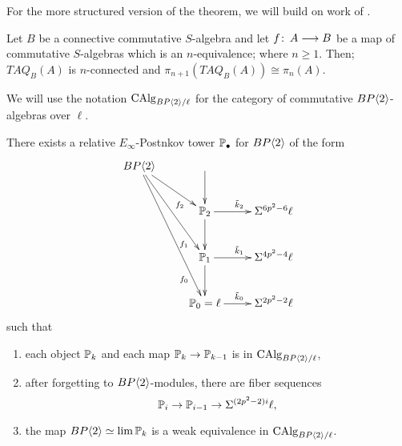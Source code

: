 For the more structured version of the theorem, we will build on work of \cite{Basterra}.
\begin{lem}
Let $B$ be a connective commutative $S$-algebra and let $f\colon \thinspace A\longrightarrow B$ be a map of commutative $S$-algebras which is an $n$-equivalence; where $n\ge 1$. Then; $TAQ_{B}(A)$ is $n$-connected and $\pi_{n+1}(TAQ_B(A))\cong \pi_n(A)$.
\end{lem}
We will use the notation $\operatorname{CAlg}_{BP\langle 2 \rangle/\ell}$ for the category of commutative $BP\langle 2 \rangle$-algebras over $\ell$. 
\begin{thm}
There exists a relative $E_{\infty}$-Postnkov tower $\mathbb{P}_{\bullet}$ for $BP\langle 2 \rangle$ of the form 
\[ 
\xymatrix{
\B \ar[dr]_(.7){f_2} \ar[ddr]_(.8){f_1} \ar[dddr]_(.8){f_0} &	\ar[d] & \\
	&\PP_2 \ar[d] \ar[r]^{\tilde{k}_2} & \Sigma^{6p^2-6}\ell \\
	&\PP_1 \ar[d] \ar[r]^{\tilde{k}_1} & \Sigma^{4p^2-4}\ell \\
	&\PP_0=\ell \ar[r]^{\tilde{k}_0} &  \Sigma^{2p^2-2}\ell 
}
\]
such that 
\begin{enumerate}
\item each object $\mathbb{P}_k$ and each map $\mathbb{P}_k\to \mathbb{P}_{k-1}$ is in $\operatorname{CAlg}_{BP\langle 2 \rangle/\ell}$,
\item after forgetting to $BP\langle 2 \rangle$-modules, there are fiber sequences 
\[ \mathbb{P}_i\to \mathbb{P}_{i-1} \to \Sigma^{(2p^2-2)i}\ell,\]
\item the map $BP\langle 2 \rangle\simeq \lim \mathbb{P}_k$ is a weak equivalence in $\operatorname{CAlg}_{BP\langle 2 \rangle/\ell}$.
\end{enumerate}
\end{thm}
